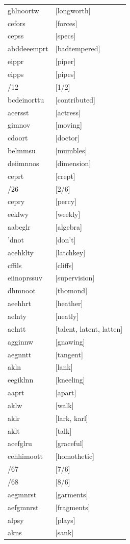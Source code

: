 \documentclass{article}
\begin{document}
\begin{tabular}{ll}
ghlnoortw & [longworth] \\
cefors & [forces] \\
cepss & [specs] \\
abddeeemprt & [badtempered] \\
eippr & [piper] \\
eipps & [pipes] \\
/12 & [1/2] \\
bcdeinorttu & [contributed] \\
acersst & [actress] \\
gimnov & [moving] \\
cdoort & [doctor] \\
belmmsu & [mumbles] \\
deiimnnos & [dimension] \\
ceprt & [crept] \\
/26 & [2/6] \\
cepry & [percy] \\
eeklwy & [weekly] \\
aabeglr & [algebra] \\
'dnot & [don't] \\
acehklty & [latchkey] \\
cffils & [cliffs] \\
eiinoprssuv & [supervision] \\
dhmnoot & [thomond] \\
aeehhrt & [heather] \\
aelnty & [neatly] \\
aelntt & [talent, latent, latten] \\
agginnw & [gnawing] \\
aegnntt & [tangent] \\
akln & [lank] \\
eegiklnn & [kneeling] \\
aaprt & [apart] \\
aklw & [walk] \\
aklr & [lark, karl] \\
aklt & [talk] \\
acefglru & [graceful] \\
cehhimoott & [homothetic] \\
/67 & [7/6] \\
/68 & [8/6] \\
aegmnrst & [garments] \\
aefgmnrst & [fragments] \\
alpsy & [plays] \\
akns & [sank] \\

\end{tabular}
\end{document}
